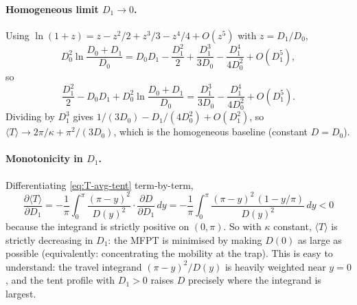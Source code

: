 \paragraph{Homogeneous limit $D_1\to 0$.}
Using $\ln(1+z)=z-z^2/2+z^3/3-z^4/4+O(z^5)$ with $z=D_1/D_0$,
\[
D_0^2\ln\!\frac{D_0+D_1}{D_0}=D_0 D_1-\frac{D_1^2}{2}+\frac{D_1^3}{3D_0}-\frac{D_1^4}{4D_0^2}+O(D_1^5),
\]
so
\[
\frac{D_1^2}{2}-D_0 D_1+D_0^2\ln\!\frac{D_0+D_1}{D_0}
=\frac{D_1^3}{3D_0}-\frac{D_1^4}{4D_0^2}+O(D_1^5).
\]
Dividing by $D_1^3$ gives $1/(3D_0)-D_1/(4D_0^2)+O(D_1^2)$, so
$\langle T\rangle\to 2\pi/\kappa+\pi^2/(3D_0)$, which is the homogeneous
baseline (constant $D=D_0$).

\paragraph{Monotonicity in $D_1$.}
Differentiating \eqref{eq:T-avg-tent} term-by-term,
\[
\frac{\partial\langle T\rangle}{\partial D_1}
=-\frac{1}{\pi}\!\int_0^\pi\!\frac{(\pi-y)^2}{D(y)^2}\cdot\frac{\partial D}{\partial D_1}\,dy
=-\frac{1}{\pi}\!\int_0^\pi\!\frac{(\pi-y)^2\,(1-y/\pi)}{D(y)^2}\,dy<0
\]
because the integrand is strictly positive on $(0,\pi)$.  So with $\kappa$
constant, $\langle T\rangle$ is strictly decreasing in $D_1$: the MFPT is
minimised by making $D(0)$ as large as possible (equivalently: concentrating
the mobility at the trap).  This is easy to understand: the travel integrand
$(\pi-y)^2/D(y)$ is heavily weighted near $y=0$, and the tent profile with
$D_1>0$ raises $D$ precisely where the integrand is largest.
